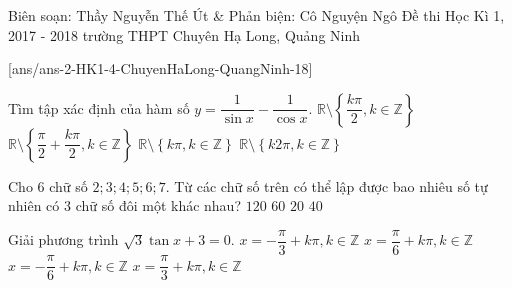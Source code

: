 	\begin{name}
{Biên soạn: Thầy Nguyễn Thế Út \& Phản biện: Cô Nguyện Ngô}
		{Đề thi Học Kì 1, 2017 - 2018 trường THPT Chuyên Hạ Long, Quảng Ninh}
	\end{name}
\setcounter{ex}{0}
[ans/ans-2-HK1-4-ChuyenHaLong-QuangNinh-18]


\begin{ex}%
Tìm tập xác định của hàm số $ y=\dfrac{1}{\sin x}-\dfrac{1}{\cos x}. $
\choice
{\True $ \mathbb{R}\setminus\left\lbrace \dfrac{k\pi}{2},k\in\mathbb{Z} \right\rbrace $}
{$ \mathbb{R}\setminus\left\lbrace\dfrac{\pi}{2}+ \dfrac{k\pi}{2},k\in\mathbb{Z} \right\rbrace $}
{$ \mathbb{R}\setminus\left\lbrace k\pi,k\in\mathbb{Z} \right\rbrace $}
{$ \mathbb{R}\setminus\left\lbrace k2\pi,k\in\mathbb{Z} \right\rbrace $}
\end{ex}

\begin{ex}%
Cho $ 6 $ chữ số $ 2;3;4;5;6;7 $. Từ các chữ số trên có thể lập được bao nhiêu số tự nhiên có $ 3 $ chữ số đôi một khác nhau?
\choice
{\True $ 120 $}
{$ 60 $}
{$ 20 $}
{$ 40 $}
\end{ex}

\begin{ex}%
Giải phương trình $ \sqrt{3}\tan x+3=0. $
\choice
{\True $ x=-\dfrac{\pi}{3}+k\pi,k\in\mathbb{Z} $}
{$ x=\dfrac{\pi}{6}+k\pi,k\in\mathbb{Z} $}
{$ x=-\dfrac{\pi}{6}+k\pi,k\in\mathbb{Z} $}
{$ x=\dfrac{\pi}{3}+k\pi,k\in\mathbb{Z} $}
\end{ex}


